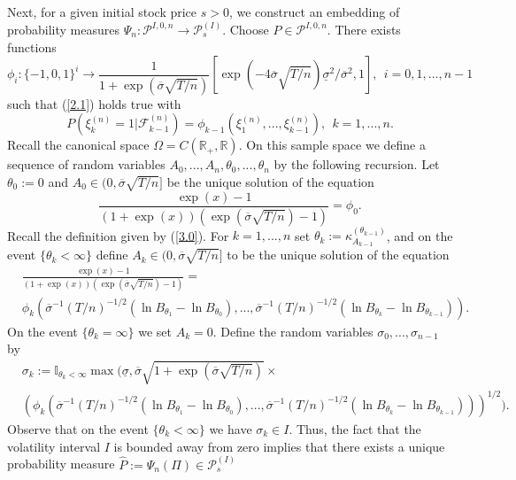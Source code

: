 \documentclass{amsart}
\numberwithin{equation}{section}
\begin{document}
Next, for a given initial stock price $s>0$, we
construct an embedding of probability measures
$\Psi_n:\mathcal P^{I,0,n}\rightarrow \mathcal P^{(I)}_s$.
Choose
$P\in  \mathcal P^{I,0,n}$. There exists functions
\[\phi_i:\{-1,0,1\}^i\rightarrow \frac{1}{1+\exp(\overline{\sigma}\sqrt{T/n})}\left[\exp\left(-4\overline{\sigma}\sqrt{T/n}\right)\underline{\sigma}^2/\overline{\sigma}^2,1\right], \ \ i=0,1,...,n-1\]
such that (\ref{2.1}) holds true with
\begin{equation*}
 P(\xi^{(n)}_k=1|\mathcal F^{(n)}_{k-1})=
\phi_{k-1}(\xi^{(n)}_1,...,\xi^{(n)}_{k-1}), \ \  k=1,...,n.
\end{equation*}
Recall the canonical space $\Omega=C(\mathbb R_{+},\mathbb R)$.
On this sample space we define a sequence of random variables
$A_0,...,A_{n},\theta_0,...,\theta_{n}$ by the following recursion.
Let $\theta_0:=0$ and
$A_0\in (0,\overline{\sigma}\sqrt{T/n}]$ be the unique solution of the equation
\begin{equation*}
\frac{\exp(x)-1}{(1+\exp(x))(\exp(\overline{\sigma}\sqrt{T/n})-1)}=\phi_0.
\end{equation*}
Recall the definition given by (\ref{3.0}). For $k=1,...,n$ set $\theta_k:=\kappa^{(\theta_{k-1})}_{A_{k-1}}$,
and on the event $\{\theta_k<\infty\}$ define $A_{k}\in (0,\overline{\sigma}\sqrt{T/n}]$ to be the unique solution of the equation
\begin{eqnarray*}
&\frac{\exp(x)-1}{(1+\exp(x))(\exp(\overline{\sigma}\sqrt{T/n})-1)}= \\
&\phi_{k}\left(\overline{\sigma}^{-1}(T/n)^{-1/2}(\ln  B_{\theta_1}- \ln B_{\theta_0}),..., \overline{\sigma}^{-1}(T/n)^{-1/2}(\ln B_{\theta_{k}}-\ln B_{\theta_{k-1}})
\right).
\end{eqnarray*}
On the event $\{\theta_k=\infty\}$ we set $A_k=0$.
Define the random variables $\sigma_0,...,\sigma_{n-1}$ by
\begin{eqnarray}\label{3.50}
&\sigma_{k}:=\mathbb{I}_{\theta_k<\infty}\max\bigg(\underline{\sigma},\overline\sigma \sqrt{1+\exp(\overline{\sigma}\sqrt{T/n})}\times\\
&\left(\phi_{k}\left(\overline{\sigma}^{-1}(T/n)^{-1/2}(\ln B_{\theta_1}- \ln B_{\theta_0}),..., \overline{\sigma}^{-1}(T/n)^{-1/2}(\ln B_{\theta_{k}}-\ln  B_{\theta_{k-1}})\right)\right)^{1/2}
\bigg).\nonumber
\end{eqnarray}
Observe that on the event $\{\theta_k<\infty\}$ we have $\sigma_k\in I$.
Thus, the fact that the volatility interval $I$ is bounded away from zero
implies that there exists a unique probability measure $\hat P:=\Psi_n(\Pi)\in \mathcal P^{(I)}_s$
\end{document}

